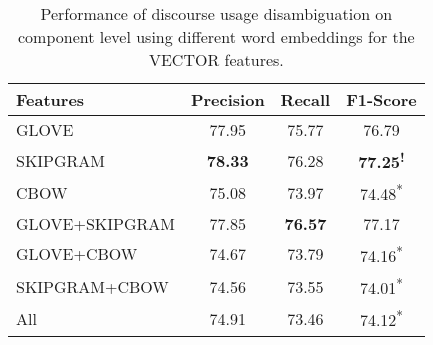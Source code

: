 \begin{table}[!htbp]
\centering
\begin{tabular}{|l|c|c|c|}
\hline

Features        &     Precision &     Recall &     F1-Score                 \\ \hline
GLOVE           &     77.95     &     75.77  &     76.79\textsuperscript{ } \\ \hline
SKIPGRAM        & \bf 78.33     &     76.28  & \bf 77.25\textsuperscript{!} \\ \hline
CBOW            &     75.08     &     73.97  &     74.48\textsuperscript{*} \\ \hline
GLOVE+SKIPGRAM  &     77.85     & \bf 76.57  &     77.17\textsuperscript{ } \\ \hline
GLOVE+CBOW      &     74.67     &     73.79  &     74.16\textsuperscript{*} \\ \hline
SKIPGRAM+CBOW   &     74.56     &     73.55  &     74.01\textsuperscript{*} \\ \hline
All             &     74.91     &     73.46  &     74.12\textsuperscript{*} \\ \hline

\end{tabular}
\caption{\label{t:recognition-vectors} Performance of discourse usage
disambiguation on component level using different word embeddings for
the VECTOR features. }
\end{table}
